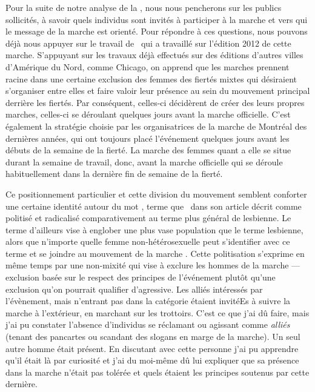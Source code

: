 Pour la suite de notre analyse de la \dm{}, nous nous pencherons sur les publics sollicités, à savoir quels individus sont invités à participer à la marche et vers qui le message de la marche est orienté. 
Pour répondre à ces questions, nous pouvons déjà nous appuyer sur le travail de~\cite{Podmore2015a} qui a travaillé sur l'édition 2012 de cette marche. 
S'appuyant sur les travaux déjà effectués sur des éditions d'autres villes d'Amérique du Nord, comme Chicago, on apprend que les marches \dykes{} prennent racine dans une certaine exclusion des femmes des fiertés mixtes qui désiraient s'organiser entre elles et faire valoir leur présence au sein du mouvement principal derrière les fiertés. 
Par conséquent, celles-ci décidèrent de créer des leurs propres marches, celles-ci se déroulant quelques jours avant la marche officielle. 
C'est également la stratégie choisie par les organisatrices de la marche de Montréal des dernières années, qui ont toujours placé l'événement quelques jours avant les débuts de la semaine de la fierté. La marche des femmes quant a elle se situe durant la semaine de travail, donc, avant la marche officielle qui se déroule habituellement dans la dernière fin de semaine de la fierté.

Ce positionnement particulier et cette division du mouvement semblent conforter une certaine identité autour du mot \dyke{}, terme que~\citet{Podmore2015a} dans son article  décrit comme politisé et radicalisé comparativement au terme plus général de lesbienne. 
Le terme \dyke{} d'ailleurs vise à englober une plus vase population que le terme lesbienne, alors que n'importe quelle femme non-hétérosexuelle peut s'identifier avec ce terme et se joindre au mouvement de la marche \dyke{}. 
Cette politisation s'exprime en même temps par une non-mixité qui vise à exclure les hommes de la marche --- exclusion basée sur le respect des principes de l'événement plutôt qu'une exclusion qu'on pourrait qualifier d'agressive. 
Les alliés intéressés par l'évènement, mais n'entrant pas dans la catégorie \dyke{} étaient invitéEs à suivre la marche à l'extérieur, en marchant sur les trottoirs. 
C'est ce que j'ai dû faire, mais j'ai pu constater l'absence d'individus se réclamant ou agissant comme \emph{alliés} (tenant des pancartes ou scandant des slogans en marge de la marche). 
Un seul autre homme était présent. 
En discutant avec cette personne j'ai pu apprendre qu'il était là par curiosité et j'ai du moi-même dû lui expliquer que sa présence dans la marche n'était pas tolérée et quels étaient les principes soutenus par cette dernière.

